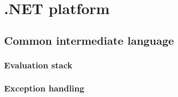 \chapter{.NET platform}

\section{Common intermediate language}

\subsection{Evaluation stack}

\subsection{Exception handling}
